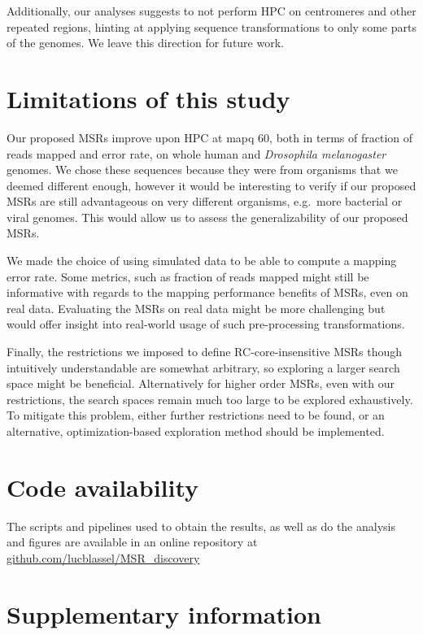 \documentclass[
  11pt,
  twoside]{scrbook}
\begin{document}
Additionally, our analyses suggests to not perform HPC on centromeres and other
repeated regions, hinting at applying sequence transformations to only some
parts of the genomes. We leave this direction for future work.

\hypertarget{limitations-of-this-study}{%
\section{Limitations of this study}\label{limitations-of-this-study}}

Our proposed MSRs improve upon HPC at mapq 60, both in terms of fraction of
reads mapped and error rate, on whole human and \emph{Drosophila melanogaster}
genomes. We chose these sequences because they were from organisms that we
deemed different enough, however it would be interesting to verify if our
proposed MSRs are still advantageous on very different organisms, e.g.~more
bacterial or viral genomes. This would allow us to assess the generalizability
of our proposed MSRs.

We made the choice of using simulated data to be able to compute a mapping error
rate. Some metrics, such as fraction of reads mapped might still be informative
with regards to the mapping performance benefits of MSRs, even on real data.
Evaluating the MSRs on real data might be more challenging but would offer
insight into real-world usage of such pre-processing transformations.

Finally, the restrictions we imposed to define RC-core-insensitive MSRs though
intuitively understandable are somewhat arbitrary, so exploring a larger search
space might be beneficial. Alternatively for higher order MSRs, even with our
restrictions, the search spaces remain much too large to be explored
exhaustively. To mitigate this problem, either further restrictions need to be
found, or an alternative, optimization-based exploration method should be
implemented.

\hypertarget{code-availability}{%
\section{Code availability}\label{code-availability}}

The scripts and pipelines used to obtain the results, as well as do the analysis
and figures are available in an online repository at
\href{https://github.com/lucblassel/MSR_discovery}{github.com/lucblassel/MSR\_discovery}

\hypertarget{supplementary-information}{%
\section*{Supplementary information}\label{supplementary-information}}
\end{document}
